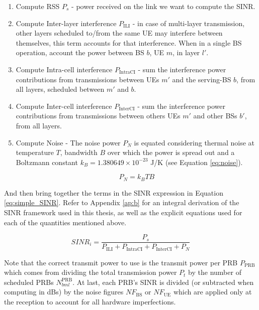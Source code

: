 \begin{enumerate}
    \begin{enumerate}
        \item Compute \ac{RSS} $P_s$ - power received on the link we want to compute the SINR. 
        \item Compute Inter-layer interference $P_\text{ILI}$ - in case of multi-layer transmission, other layers scheduled to/from the same UE may interfere between themselves, this term accounts for that interference. When in a single BS operation, account the power between BS $b$, UE $m$, in layer $l'$.
        \item Compute Intra-cell interference $P_\text{IntraCI}$ - sum the interference power contributions from transmissions between UEs $m'$ and the serving-BS $b$, from all layers, scheduled between $m'$ and $b$.
        \item Compute Inter-cell interference $P_\text{InterCI}$ - sum the interference power contributions from transmissions between others UEs $m'$ and other BSs $b'$, from all layers.
        \item Compute Noise - The noise power $P_N$ is equated considering thermal noise at temperature $T$, bandwidth $B$ over which the power is spread out and a Boltzmann constant $k_B = 1.380649 \times 10^{-23}$ J/K (see Equation \ref{eq:noise}).
        
        \begin{equation} \label{eq:noise}
            P_N = k_B T B
        \end{equation}

    \end{enumerate}

    And then bring together the terms in the SINR expression in Equation \eqref{eq:simple_SINR}. Refer to Appendix \ref{ap:b} for an integral derivation of the SINR framework used in this thesis, as well as the explicit equations used for each of the quantities mentioned above. 

    \begin{equation} \label{eq:simple_SINR}
        SINR_i = \frac{P_s}{P_\text{ILI} + P_\text{IntraCI} + P_\text{InterCI} + P_N}
    \end{equation}

    Note that the correct transmit power to use is the transmit power per PRB $P_\text{PRB}$ which comes from dividing the total transmission power $P_t$ by the number of scheduled PRBs $N_{bml}^\text{PRB}$.
    At last, each PRB's SINR is divided (or subtracted when computing in dBs) by the noise figures $NF_\text{BS}$ or $NF_\text{UE}$ which are applied only at the reception to account for all hardware imperfections.


\end{enumerate}
